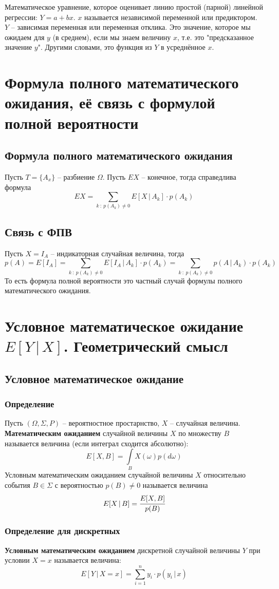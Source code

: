 \documentclass{article}
\begin{document}
Математическое уравнение, которое оценивает линию простой (парной) линейной регрессии: $Y=a+bx$. $x$ называется независимой переменной или предиктором. $Y$ – зависимая переменная или переменная отклика. Это значение, которое мы ожидаем для $y$ (в среднем), если мы знаем величину $x$, т.е. это "предсказанное значение $y$". Другими словами, это функция из $Y$ в усреднённое $x$.
\newpage
\section{Формула полного математического ожидания, её связь с формулой полной вероятности}
\subsection{Формула полного математического ожидания}
Пусть $T=\{A_x\}$ -- разбиение $\Omega$. Пусть $EX$ -- конечное, тогда справедлива формула
$$ EX=\sum_{k\::\:p(A_k)\neq 0} E[X\,|\,A_k]\cdot p(A_k) $$
\subsection{Связь с ФПВ}
Пусть $X=I_A$ -- индикаторная случайная величина, тогда $$p(A)=E[I_A]=\sum_{k\::\:p(A_k)\neq 0} E[I_A\,|\,A_k]\cdot p(A_k)=\sum_{k\::\:p(A_k)\neq 0} p(A\,|\,A_k)\cdot p(A_k)$$ То есть формула полной вероятности это частный случай формулы полного математического ожидания.
\newpage
\section{Условное математическое ожидание $E[Y\,|\,X]$. Геометрический смысл}
\subsection{Условное математическое ожидание}
\subsubsection{Определение}
Пусть $(\Omega,\Sigma,P)$ -- вероятностное простарнство, $X$ -- случайная величина. \textbf{Математическим ожиданием} случайной величины $X$ по множеству $B$ называется величина (если интеграл сходится абсолютно):
$$ E[X,B]=\int\limits_{B}X(\omega)p(d\omega) $$
Условным математическим ожиданием случайной величины $X$ относительно события $B\in\Sigma$ с вероятностью $p(B)\neq 0$ называется величина
$$ E[X\,|\,B]=\cfrac{E[X,B]}{p(B)} $$
\subsubsection{Определение для дискретных}
\textbf{Условным математическим ожиданием} дискретной случайной величины $Y$ при условии $X=x$ называется величина:
$$ E[Y\,|\,X=x]=\sum_{i=1}^n y_i\cdot p(y_i\,|\,x) $$
\end{document}
